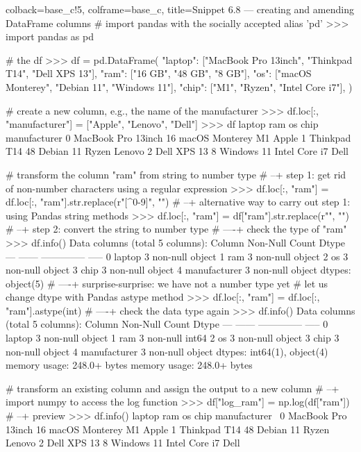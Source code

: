 \documentclass[a4paper,11pt]{book}
\begin{document}
\begin{pythoncode}[linenos=True]{colback=base_c!5, colframe=base_c, title=\sffamily Snippet 6.8 --- creating and amending DataFrame columns}
# import pandas with the socially accepted alias 'pd'
>>> import pandas as pd

# the df
>>> df = pd.DataFrame(
        {
            "laptop": ["MacBook Pro 13inch", "Thinkpad T14", "Dell XPS 13"],
            "ram": ["16 GB", "48 GB", "8 GB"],
            "os": ["macOS Monterey", "Debian 11", "Windows 11"],
            "chip": ["M1", "Ryzen", "Intel Core i7"],
        }
)

# create a new column, e.g., the name of the manufacturer
>>> df.loc[:, "manufacturer"] = ["Apple", "Lenovo", "Dell"]
>>> df
               laptop ram              os           chip manufacturer
0  MacBook Pro 13inch  16  macOS Monterey             M1        Apple
1        Thinkpad T14  48       Debian 11          Ryzen       Lenovo
2         Dell XPS 13   8      Windows 11  Intel Core i7         Dell

# transform the column "ram" from string to number type 
# --+ step 1: get rid of non-number characters using a regular expression 
>>> df.loc[:, "ram"] = df.loc[:, "ram"].str.replace(r"[^0-9]", "")
# --+ alternative way to carry out step 1: using Pandas string methods 
>>> df.loc[:, "ram"] = df["ram"].str.replace(r"\sGB", "")
# --+ step 2: convert the string to number type
# ----+ check the type of "ram"
>>> df.info()
Data columns (total 5 columns):
     Column        Non-Null Count  Dtype 
---  ------        --------------  ----- 
 0   laptop        3 non-null      object
 1   ram           3 non-null      object
 2   os            3 non-null      object
 3   chip          3 non-null      object
 4   manufacturer  3 non-null      object
dtypes: object(5)
# ----+ surprise-surprise: we have not a number type yet
# let us change dtype with Pandas astype method
>>> df.loc[:, "ram"] = df.loc[:, "ram"].astype(int)
# ----+ check the data type again
>>> df.info()
Data columns (total 5 columns):
     Column        Non-Null Count  Dtype 
---  ------        --------------  ----- 
 0   laptop        3 non-null      object
 1   ram           3 non-null      int64 
 2   os            3 non-null      object
 3   chip          3 non-null      object
 4   manufacturer  3 non-null      object
dtypes: int64(1), object(4)
memory usage: 248.0+ bytes
memory usage: 248.0+ bytes

# transform an existing column and assign the output to a new column 
# --+ import numpy to access the log function 
>>> df["log_ram"] = np.log(df["ram"])
# --+ preview
>>> df.info()
               laptop  ram              os           chip manufacturer  \
0  MacBook Pro 13inch   16  macOS Monterey             M1        Apple   
1        Thinkpad T14   48       Debian 11          Ryzen       Lenovo   
2         Dell XPS 13    8      Windows 11  Intel Core i7         Dell   


\end{pythoncode}
\end{document}
